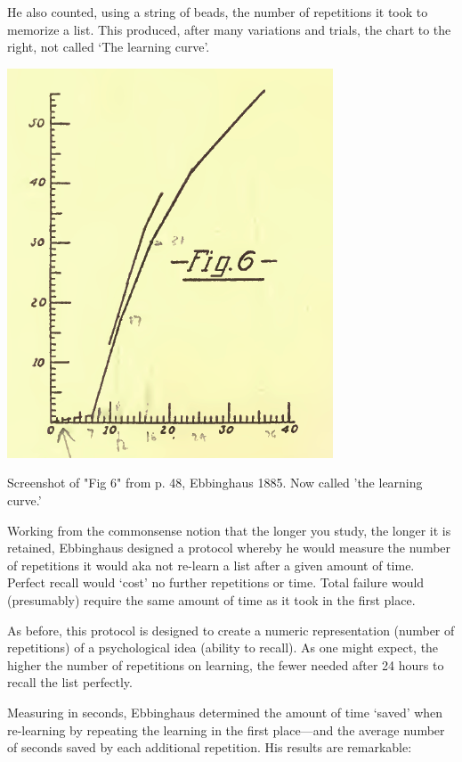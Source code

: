 \begin{refsection}
He also counted, using a string of beads, the number of repetitions it took to memorize a list. This produced, after many variations and trials, the chart to the right, not called `The learning curve'.
\begin{marginfigure}
 \begin{center}

     \includegraphics[scale=0.5]{../images/ebbinghausFig6.png}
\end{center}
 \caption{Screenshot of "Fig 6" from p. 48, Ebbinghaus 1885. Now called 'the learning curve.'}
\label{fig: ebbinghaus6}
\end{marginfigure}


 Working from the commonsense notion that the longer you study, the longer it is retained, Ebbinghaus designed a protocol whereby he would measure the number of repetitions it would aka not re-learn a list after a given amount of time. Perfect recall would `cost' no further repetitions or time. Total failure would (presumably) require the same amount of time as it took in the first place.

As before, this protocol is designed to create a numeric representation (number of repetitions) of a psychological idea (ability to recall). As one might expect, the higher the number of repetitions on learning, the fewer needed after 24 hours to recall the list perfectly.

Measuring in seconds, Ebbinghaus determined the amount of time `saved' when re-learning by repeating the learning in the first place---and the average number of seconds saved by each additional repetition. His results are remarkable:
\begin{marginfigure}
 \begin{center}


\end{center}
\end{marginfigure}
\end{refsection}
